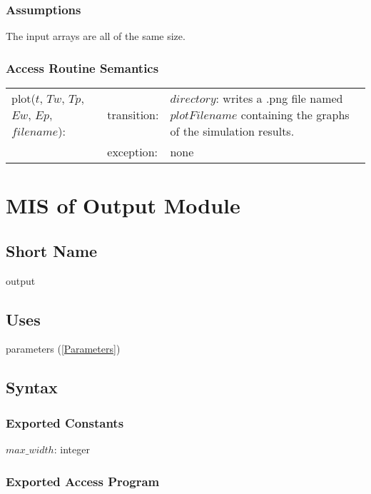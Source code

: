 \documentclass[12pt]{article}
\begin{document}
\subsubsection{Assumptions}

The input arrays are all of the same size.

\subsubsection{Access Routine Semantics}

\begin{center}
\begin{tabular}{l l p{6cm}}
plot($t$, $Tw$, $Tp$, $Ew$, $Ep$, $filename$): & transition: & $directory$: writes a .png file named $plotFilename$ containing the graphs of the simulation results. \\
& exception: & none \\
\end{tabular}
\end{center}

\section{MIS of Output Module} \label{Output}

\subsection{Short Name}

output

\subsection{Uses}

parameters (\ref{Parameters})

\subsection{Syntax}

\subsubsection{Exported Constants}

$max\_width$: integer

\subsubsection{Exported Access Program}
\end{document}
